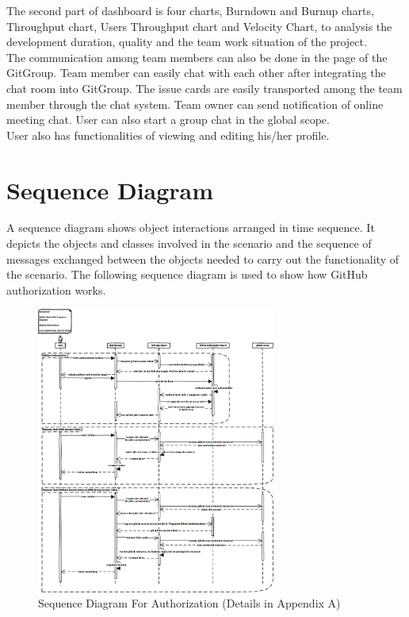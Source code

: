 \documentclass[12pt,a4paper]{report}
\begin{document}
The second part of dashboard is four charts, Burndown and Burnup charts, Throughput chart, Users Throughput chart and Velocity Chart, to analysis the development duration, quality and the team work situation of the project.\\
The communication among team members can also be done in the page of the GitGroup. Team member can easily chat with each other after integrating the chat room into GitGroup. The issue cards are easily transported among the team member through the chat system. Team owner can send notification of online meeting chat. User can also start a group chat in the global scope.\\
User also has functionalities of viewing and editing his/her profile.

\section{Sequence Diagram}
A sequence diagram shows object interactions arranged in time sequence. It depicts the objects and classes involved in the scenario and the sequence of messages exchanged between the objects needed to carry out the functionality of the scenario.
The following sequence diagram is used to show how GitHub authorization works.
\begin{figure}[H]
	\centering
	\includegraphics[width=0.7\textwidth]{./pics/AuthSequenceDiagram.png}
	\caption{Sequence Diagram For Authorization (Details in Appendix A)}
\end{figure}
\end{document}
